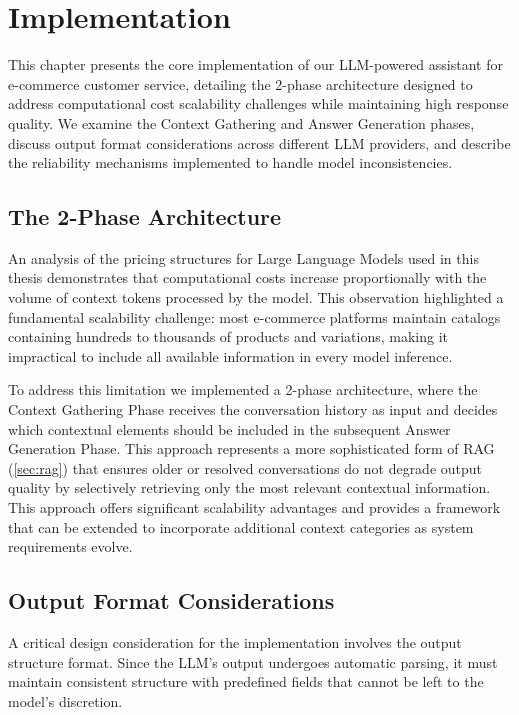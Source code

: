 \chapter{Implementation}
\label{cha:impl}

This chapter presents the core implementation of our LLM-powered assistant for e-commerce customer service, detailing the 2-phase architecture designed to address computational cost scalability challenges while maintaining high response quality.
We examine the Context Gathering and Answer Generation phases, discuss output format considerations across different LLM providers, and describe the reliability mechanisms implemented to handle model inconsistencies.

\section{The 2-Phase Architecture}

An analysis of the pricing structures for Large Language Models used in this thesis \cite{gemini_pricing, anthropic_pricing, deepseek_pricing, openai_pricing} demonstrates that computational costs increase proportionally with the volume of context tokens processed by the model.
This observation highlighted a fundamental scalability challenge: most e-commerce platforms maintain catalogs containing hundreds to thousands of products and variations, making it impractical to include all available information in every model inference.

To address this limitation we implemented a 2-phase architecture, where the Context Gathering Phase receives the conversation history as input and decides which contextual elements should be included in the subsequent Answer Generation Phase.
This approach represents a more sophisticated form of RAG (\cref{sec:rag}) that ensures older or resolved conversations do not degrade output quality by selectively retrieving only the most relevant contextual information.
This approach offers significant scalability advantages and provides a framework that can be extended to incorporate additional context categories as system requirements evolve.

\section{Output Format Considerations}
\label{sec:output_format}

A critical design consideration for the implementation involves the output structure format. Since the LLM's output undergoes automatic parsing, it must maintain consistent structure with predefined fields that cannot be left to the model's discretion.

